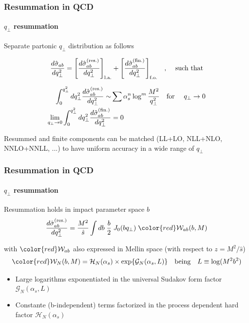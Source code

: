 \documentclass[aspectratio=43]{beamer}
\begin{document}
\begin{frame}

	\frametitle{Resummation in QCD}
	\framesubtitle{$q_{\perp}$ resummation}

	Separate partonic $q_{\perp}$ distribution as follows
	
	\begin{equation}
		\frac{d\hat{\sigma}_{ab}}{dq_{\perp}^{2}} =
		\Bigg[ \frac{d\hat{\sigma}^{\textrm{(res.)}}_{ab}}{dq_{\perp}^{2}} \Bigg]_{\textrm{l.a.}} + 
		\Bigg[ \frac{d\hat{\sigma}^{\textrm{(fin.)}}_{ab}}{dq_{\perp}^{2}} \Bigg]_{\textrm{f.o.}} \textrm{\quad, \quad such that} \nonumber
	\end{equation}

	\begin{align}
		\int_{0}^{q_{\perp}^{2}} dq_{\perp}^{2} \frac{d\hat{\sigma}^{\textrm{(res.)}}_{ab}}{dq_{\perp}^{2}} \sim & \sum \alpha_{s}^{n} \log^{m} \frac{M^{2}}{q_{\perp}^{2}} \textrm{\quad for \quad} q_{\perp} \rightarrow 0 \nonumber \\
		\lim_{q_{\perp} \rightarrow 0}\int_{0}^{q_{\perp}^{2}} dq_{\perp}^{2} \frac{d\hat{\sigma}^{\textrm{(fin.)}}_{ab}}{dq_{\perp}^{2}} &= 0 \nonumber 
	\end{align}

	Resummed and finite components can be matched (LL+LO, NLL+NLO, NNLO+NNLL, ...) to have uniform accuracy in a wide range of $q_{\perp}$
\end{frame}

\begin{frame}

	\frametitle{Resummation in QCD}
	\framesubtitle{$q_{\perp}$ resummation}
	
	Resummation holds in impact parameter space $b$
	\begin{equation}
		\frac{d\hat{\sigma}_{ab}^{\textrm{(res.)}}}{dq_{\perp}^{2}} = \frac{M^{2}}{\hat{s}} \int db \; \frac{b}{2} \; J_{0}(b q_{\perp}) \; {\color{red} \mathcal{W}_{ab}(b, M)} \nonumber
	\end{equation}
	
	with ${\color{red}\mathcal{W}_{ab}}$ also expressed in Mellin space (with respect to $z = M^{2}/\hat{s}$)
	\begin{equation}
		{\color{red} \mathcal{W}_{N}(b, M) = \mathcal{H}_{N}(\alpha_{s}) \times \exp\{\mathcal{G}_{N}(\alpha_{s}, L)\}} \quad\textrm{being}\quad L \equiv \log(M^{2}b^{2}) \nonumber
	\end{equation}

	\begin{itemize}
		\item Large logarithms exponentiated in the universal Sudakov form factor {\color{red}$\mathcal{G}_{N}(\alpha_{s}, L)$}
		\item Constante (b-independent) terms factorized in the process dependent hard factor {\color{red}$\mathcal{H}_{N}(\alpha_{s})$}
	\end{itemize}

	
\end{frame}
\end{document}
